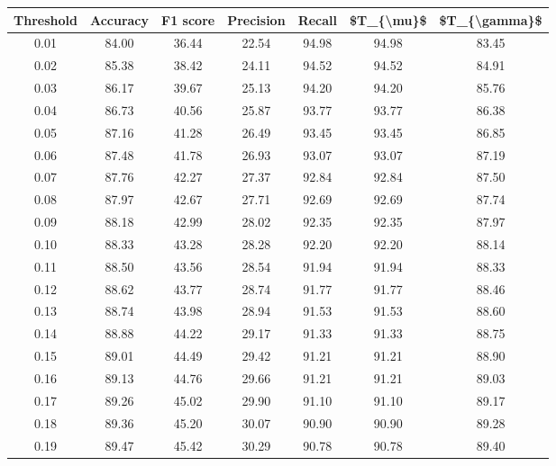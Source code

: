 \begin{tabular}{|c|c|c|c|c|c|c|}
\hline
 Threshold &  Accuracy &  F1 score &  Precision &  Recall &  \$T\_\{\textbackslash mu\}\$ &  \$T\_\{\textbackslash gamma\}\$ \\
\hline
      0.01 &     84.00 &     36.44 &      22.54 &   94.98 &      94.98 &         83.45 \\
      0.02 &     85.38 &     38.42 &      24.11 &   94.52 &      94.52 &         84.91 \\
      0.03 &     86.17 &     39.67 &      25.13 &   94.20 &      94.20 &         85.76 \\
      0.04 &     86.73 &     40.56 &      25.87 &   93.77 &      93.77 &         86.38 \\
      0.05 &     87.16 &     41.28 &      26.49 &   93.45 &      93.45 &         86.85 \\
      0.06 &     87.48 &     41.78 &      26.93 &   93.07 &      93.07 &         87.19 \\
      0.07 &     87.76 &     42.27 &      27.37 &   92.84 &      92.84 &         87.50 \\
      0.08 &     87.97 &     42.67 &      27.71 &   92.69 &      92.69 &         87.74 \\
      0.09 &     88.18 &     42.99 &      28.02 &   92.35 &      92.35 &         87.97 \\
      0.10 &     88.33 &     43.28 &      28.28 &   92.20 &      92.20 &         88.14 \\
      0.11 &     88.50 &     43.56 &      28.54 &   91.94 &      91.94 &         88.33 \\
      0.12 &     88.62 &     43.77 &      28.74 &   91.77 &      91.77 &         88.46 \\
      0.13 &     88.74 &     43.98 &      28.94 &   91.53 &      91.53 &         88.60 \\
      0.14 &     88.88 &     44.22 &      29.17 &   91.33 &      91.33 &         88.75 \\
      0.15 &     89.01 &     44.49 &      29.42 &   91.21 &      91.21 &         88.90 \\
      0.16 &     89.13 &     44.76 &      29.66 &   91.21 &      91.21 &         89.03 \\
      0.17 &     89.26 &     45.02 &      29.90 &   91.10 &      91.10 &         89.17 \\
      0.18 &     89.36 &     45.20 &      30.07 &   90.90 &      90.90 &         89.28 \\
      0.19 &     89.47 &     45.42 &      30.29 &   90.78 &      90.78 &         89.40 \\

\end{tabular}
